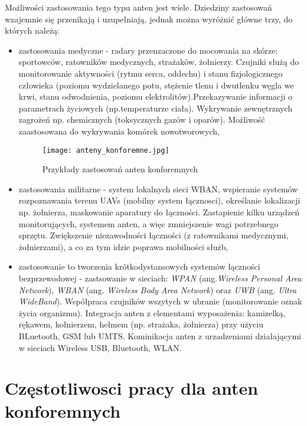 Możliwości zastosowania tego typu anten jest wiele. Dziedziny zastosowań wzajemnie się przenikają i uzupełniają, jednak można wyróżnić główne trzy, do których należą:

\begin{itemize}\setlength{\itemsep}{0pt}
	
	\item zastosowania medyczne - radary przenzaczone do mocowania na skórze: sportowców, ratowników medycznych, strażaków, żołnierzy. Czujniki służą do monitorowanie aktywności (rytmu serca, oddechu) i stanu fizjologicznego człowieka (poziomu wydzielanego potu, stężenie tlenu i dwutlenku węgla we krwi, stanu odwodnienia, poziomu elektrolitów).Przekazywanie informacji o parametrach życiowych (np.temperaturze ciała). Wykrywanie zewnętrznych zagrożeń np. chemicznych (toksycznych gazów i oparów). Możliwość zaastosowana do wykrywania komórek nowotworowych,  

\begin{figure}[h!]
\centering
	\texttt{[image: anteny\_konforemne.jpg]}
	\caption{Przykłady zastosowań anten konforemnych}
\end{figure}

	\item zastosowania militarne - system lokalnych sieci WBAN, wspieranie systemów rozpoznawania terenu UAVs (mobilny system łącznosci), określanie lokalizacji np. żołnierza, maskowanie aparatury do łączności.
	Zastapienie kilku urządzeń monitorujących, systemem anten, a więc zmniejszenie wagi potrzebnego sprzętu. Zwiększenie niezawodności łączności (z ratownikami medycznymi, żołnierzami), a co za tym idzie poprawa mobilności służb,      

	\item zastosowanie to tworzenia krótkodystansowych systemów łączności bezprzewodowej - zastsowanie w sieciach: \emph{WPAN} (ang.\emph{Wireless Personal Area Network}), \emph{WBAN} (ang. \emph{Wireless Body Area Network}) oraz \emph{UWB} (ang. \emph{Ultra WideBand}). Współpraca czujników wszytych w ubranie (monitorowanie oznak życia organizmu). Integracja anten z elementami wyposażenia: kamizelką, rękawem, kołnierzem, hełmem (np. strażaka, żołnierza) przy użyciu BLuetooth, GSM lub UMTS. Kominikacja anten z urzadzeniami działającymi w sieciach Wireless USB, Bluetooth, WLAN.  

\end{itemize}
	

\section{Częstotliwosci pracy dla anten konforemnych}

